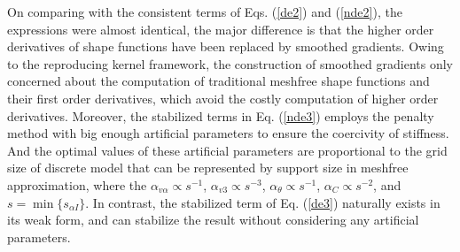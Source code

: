On comparing with the consistent terms of Eqs. (\ref{de2}) and (\ref{nde2}), the expressions were almost identical, the major difference is that the higher order derivatives of shape functions have been replaced by smoothed gradients. Owing to the reproducing kernel framework, the construction of smoothed gradients only concerned about the computation of traditional meshfree shape functions and their first order derivatives, which avoid the costly computation of higher order derivatives. Moreover, the stabilized terms in Eq. (\ref{nde3}) employs the penalty method with big enough artificial parameters to ensure the coercivity of stiffness. And the optimal values of these artificial parameters are proportional to the grid size of discrete model that can be represented by support size in meshfree approximation, where the $\alpha_{v\alpha} \propto s^{-1}$, $\alpha_{v3} \propto s^{-3}$, $\alpha_\theta \propto s^{-1}$, $\alpha_C \propto s^{-2}$\cite{benzaken2021}, and $s = \min\{s_{\alpha I}\}$. In contrast, the stabilized term of Eq. (\ref{de3}) naturally exists in its weak form, and can stabilize the result without considering any artificial parameters.
 
